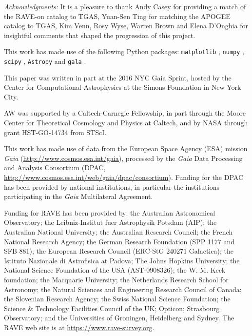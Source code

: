 \documentclass[apj, twocolappendix, numberedappendix, appendixfloats]{emulateapj}
\begin{document}
\vspace{0.5cm}
\emph{Acknowledgments:}
It is a pleasure to thank Andy Casey for providing a match of the RAVE-on catalog to TGAS, Yuan-Sen Ting for matching the APOGEE catalog to TGAS, Kim Venn, Rosy Wyse, Warren Brown and Elena D'Onghia for insightful comments that shaped the progression of this project.

This work has made use of the following Python packages: \texttt{matplotlib} \citep{mpl}, \texttt{numpy} \citep{numpy}, \texttt{scipy} \citep{scipy}, \texttt{Astropy} \citep{astropy} and \texttt{gala} \citep{gala}.

This paper was written in part at the 2016 NYC Gaia Sprint, hosted by the Center for Computational Astrophysics at the Simons Foundation in New York City.

AW was supported by a Caltech-Carnegie Fellowship, in part through the Moore Center for Theoretical Cosmology and Physics at Caltech, and by NASA through grant HST-GO-14734 from STScI.

This work has made use of data from the European Space Agency (ESA) mission {\it Gaia} (\url{http://www.cosmos.esa.int/gaia}), processed by the {\it Gaia} Data Processing and Analysis Consortium (DPAC, \url{http://www.cosmos.esa.int/web/gaia/dpac/consortium}). Funding for the DPAC has been provided by national institutions, in particular the institutions participating in the {\it Gaia} Multilateral Agreement.

Funding for RAVE has been provided by: the Australian Astronomical Observatory; the Leibniz-Institut fuer Astrophysik Potsdam (AIP); the Australian National University; the Australian Research Council; the French National Research Agency; the German Research Foundation (SPP 1177 and SFB 881); the European Research Council (ERC-StG 240271 Galactica); the Istituto Nazionale di Astrofisica at Padova; The Johns Hopkins University; the National Science Foundation of the USA (AST-0908326); the W. M. Keck foundation; the Macquarie University; the Netherlands Research School for Astronomy; the Natural Sciences and Engineering Research Council of Canada; the Slovenian Research Agency; the Swiss National Science Foundation; the Science \& Technology Facilities Council of the UK; Opticon; Strasbourg Observatory; and the Universities of Groningen, Heidelberg and Sydney.
The RAVE web site is at \url{https://www.rave-survey.org}.
\end{document}
